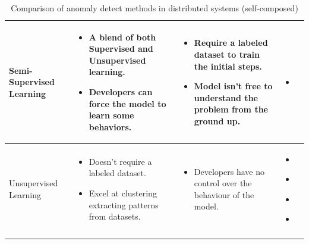 \begin{longtable}{| p{23mm} | p{44mm} | p{40mm} | p{38mm} |}
    Semi-Supervised Learning &
    \vspace{-8mm}
    \begin{itemize}[leftmargin=0mm,noitemsep,nolistsep,label={}] 
        \item A blend of both Supervised and Unsupervised learning.
        \item Developers can force the model to learn some behaviors.
        \vspace{-7mm}
    \end{itemize} &
    \vspace{-8mm}
    \begin{itemize}[leftmargin=0mm,noitemsep,nolistsep,label={}] 
        \item Require a labeled dataset to train the initial steps.
        \item Model isn’t free to understand the problem from the ground up.
        \vspace{-7mm}
    \end{itemize} &
    \vspace{-8mm}
    \begin{itemize}[leftmargin=0mm,noitemsep,nolistsep,label={}] 
        \item \cite{akcay2018ganomaly}
        \vspace{-7mm}
    \end{itemize} \\ \hline
    
    Unsupervised Learning &
    \vspace{-8mm}
    \begin{itemize}[leftmargin=0mm,noitemsep,nolistsep,label={}] 
        \item Doesn’t require a labeled dataset.
        \item Excel at clustering extracting patterns from datasets.
        \vspace{-7mm}
    \end{itemize} &
    \vspace{-8mm}
    \begin{itemize}[leftmargin=0mm,noitemsep,nolistsep,label={}] 
        \item Developers have no control over the behaviour of the model.
        \vspace{-7mm}
    \end{itemize} &
    \vspace{-8mm}
    \begin{itemize}[leftmargin=0mm,noitemsep,nolistsep,label={}] 
        \item \cite{kumarage2018anomaly}
        \item \cite{zhang2019deep}
        \item \cite{kumarage2019generative}
        \item \cite{khoshnevisan2019rsm}
        \vspace{-7mm}
    \end{itemize} \\ \hline
    \caption{Comparison of anomaly detect methods in distributed systems (self-composed)}
\end{longtable}


